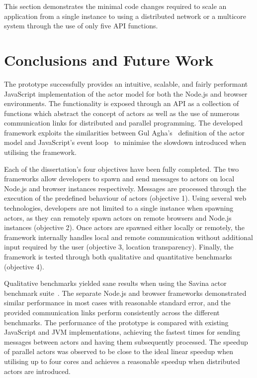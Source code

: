 \documentclass[oneside]{um-fict}
\begin{document}
This section demonstrates the minimal code changes required to scale an application from a single instance to using a distributed network or a multicore system through the use of only five API functions.
\chapter{Conclusions and Future Work}
The prototype successfully provides an intuitive, scalable, and fairly performant JavaScript implementation of the actor model for both the Node.js and browser environments. The functionality is exposed through an API as a collection of functions which abstract the concept of actors as well as the use of numerous communication links for distributed and parallel programming. The developed framework exploits the similarities between Gul Agha's~\cite{agha1985actors} definition of the actor model and JavaScript's event loop~\cite{eventloopbrowser}\cite{eventloopnode} to minimise the slowdown introduced when utilising the framework. 

Each of the dissertation's four objectives have been fully completed. The two frameworks allow developers to spawn and send messages to actors on local Node.js and browser instances respectively. Messages are processed through the execution of the predefined behaviour of actors (objective 1). Using several web technologies, developers are not limited to a single instance when spawning actors, as they can remotely spawn actors on remote browsers and Node.js instances (objective 2). Once actors are spawned either locally or remotely, the framework internally handles local and remote communication without additional input required by the user (objective 3, location transparency). Finally, the framework is tested through both qualitative and quantitative benchmarks (objective 4).

Qualitative benchmarks yielded sane results when using the Savina actor benchmark suite~\cite{savina}. The separate Node.js and browser frameworks demonstrated similar performance in most cases with reasonable standard error, and the provided communication links perform consistently across the different benchmarks. The performance of the prototype is compared with existing JavaScript and JVM implementations, achieving the fastest times for sending messages between actors and having them subsequently processed. The speedup of parallel actors was observed to be close to the ideal linear speedup when utilising up to four cores and achieves a reasonable speedup when distributed actors are introduced. 
\end{document}
